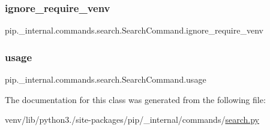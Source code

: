 \subsubsection{\texorpdfstring{ignore\+\_\+require\+\_\+venv}{ignore\_require\_venv}}
{\footnotesize\ttfamily pip.\+\_\+internal.\+commands.\+search.\+Search\+Command.\+ignore\+\_\+require\+\_\+venv\hspace{0.3cm}{\ttfamily [static]}}

\mbox{\label{classpip_1_1__internal_1_1commands_1_1search_1_1SearchCommand_a2611c1d15d4b28e26aa08a255a80bab7}} 
\subsubsection{\texorpdfstring{usage}{usage}}
{\footnotesize\ttfamily pip.\+\_\+internal.\+commands.\+search.\+Search\+Command.\+usage\hspace{0.3cm}{\ttfamily [static]}}



The documentation for this class was generated from the following file\+:\begin{DoxyCompactItemize}
\item 
venv/lib/python3./site-\/packages/pip/\+\_\+internal/commands/\hyperlink{search_8py}{search.\+py}\end{DoxyCompactItemize}
